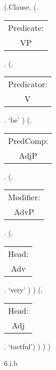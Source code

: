 \documentclass[12pt,letterpaper]{article}
\begin{document}
\begin{figure}
	\begin{center}
		\begin{parsetree}
			(.Clause.
			(.\begin{tabular}{c}Predicate:\\VP\end{tabular}.
			(.\begin{tabular}{c}Predicator:\\V\end{tabular}.    `be' )
			(.\begin{tabular}{c}PredComp:\\AdjP\end{tabular}. 
			(.\begin{tabular}{c}Modifier:\\AdvP\end{tabular}.  
			(.\begin{tabular}{c}Head:\\Adv\end{tabular}.    `very' )
			)
			(.\begin{tabular}{c}Head:\\Adj\end{tabular}. `tactful')
			)
			)
			)
			
			\hfill \break\hfill \break
		\end{parsetree}
		6.i.b
	\end{center}
\end{figure}
\end{document}
